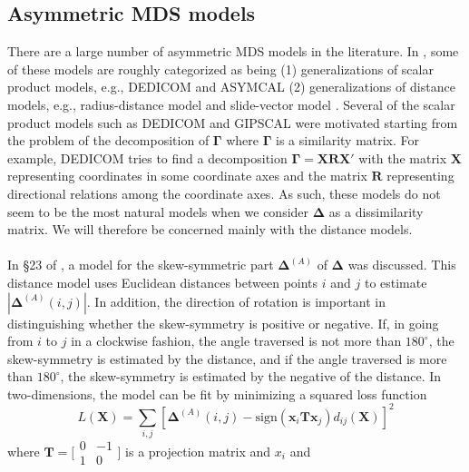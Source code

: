 \subsection{Asymmetric MDS models}
\label{sec:asymm-mds-models}
There are a large number of asymmetric MDS models in the
literature. In \citet{saito05:_data_analy_asymm_struc}, some of these
models are roughly categorized as being (1) generalizations of scalar
product models, e.g., DEDICOM \citep{harshman78:_model_n} and ASYMCAL
\citep{chino78:_n} (2) generalizations of distance models, e.g.,
radius-distance model \citep{okada87:_geomet} and slide-vector model
\citep{zielmand93:_analy,leeuw82:_handb}. Several of the scalar
product models such as DEDICOM and GIPSCAL were motivated starting
from the problem of the decomposition of $\bm{\Gamma}$ where
$\bm{\Gamma}$ is a similarity matrix. For example, DEDICOM tries to find
a decomposition $\bm{\Gamma} = \mathbf{X} \mathbf{R} \mathbf{X}'$ with
the matrix $\mathbf{X}$ representing coordinates in some coordinate
axes and the matrix $\mathbf{R}$ representing directional relations
among the coordinate axes. As such, these models do not seem to be the
most natural models when we consider $\bm{\Delta}$ as a
dissimilarity matrix. We will therefore be concerned mainly with the
distance models. \\ \\
%
\noindent In \S 23 of \citet{borg05:_moder}, a model for the
skew-symmetric part $\bm{\Delta}^{(A)}$ of $\bm{\Delta}$ was
discussed. This distance model uses Euclidean distances between points
$i$ and $j$ to estimate $| \bm{\Delta}^{(A)}(i,j)|$. In addition, the
direction of rotation is important in distinguishing whether the
skew-symmetry is positive or negative. If, in going from $i$ to $j$ in
a clockwise fashion, the angle traversed is not more than $180^\circ$,
the skew-symmetry is estimated by the distance, and if the angle
traversed is more than $180^\circ$, the skew-symmetry is estimated by
the negative of the distance. In two-dimensions, the model can be fit
by minimizing a squared loss function
\begin{equation}
  \label{eq:109}
  L(\mathbf{X}) = \sum_{i,j}[\bm{\Delta}^{(A)}(i,j) -
  \mathrm{sign}(\mathbf{x}_i \mathbf{T} \mathbf{x}_j)
  d_{ij}(\mathbf{X})]^2
\end{equation}
where $\mathbf{T} = \bigl[ \begin{smallmatrix} 0 & -1 \\ 1 &
  0 \end{smallmatrix} \bigr]$ is a projection matrix and $x_i$ and
